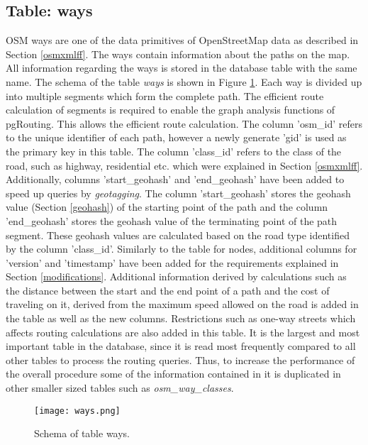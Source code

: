 \subsection{Table: ways}
OSM ways are one of the data primitives of OpenStreetMap data as described in Section \ref{osmxmlff}. The ways contain information about the paths on the map. All information regarding the ways is stored in the database table with the same name. The schema of the table \textit{ways} is shown in Figure \ref{fg:ways}. Each way is divided up into multiple segments which form the complete path. The efficient route calculation of segments is required to enable the graph analysis functions of pgRouting. This allows the efficient route calculation. The column 'osm{\_}id' refers to the unique identifier of each path, however a newly generate 'gid' is used as the primary key in this table. The column 'class{\_}id' refers to the class of the road, such as highway, residential etc. which were explained in Section \ref{osmxmlff}. Additionally, columns 'start{\_}geohash' and 'end{\_}geohash' have been added to speed up queries by \textit{geotagging}. The column 'start{\_}geohash' stores the geohash value (Section \ref{geohash}) of the starting point of the path and the column 'end{\_}geohash' stores the geohash value of the terminating point of the path segment. These geohash values are calculated based on the road type identified by the column 'class{\_}id'. Similarly to the table for nodes, additional columns for 'version' and 'timestamp' have been added for the requirements explained in Section \ref{modifications}. Additional information derived by calculations such as the distance between the start and the end point of a path and the cost of traveling on it, derived from the maximum speed allowed on the road is added in the table as well as the new columns. Restrictions such as one-way streets which affects routing calculations are also added in this table. It is the largest and most important table in the database, since it is read most frequently compared to all other tables to process the routing queries. Thus, to increase the performance of the overall procedure some of the information contained in it is duplicated in other smaller sized tables such as \textit{osm{\_}way{\_}classes}.   
\begin{figure}
\centering
\texttt{[image: ways.png]}
\caption{Schema of table ways.}
\label{fg:ways}
\end{figure}

